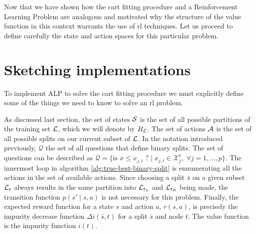 
Now that we have shown how the \ac{cart} fitting procedure and a Reinforcement
Learning Problem are analogous and motivated why the structure of the value
function in this context warrants the use of \ac{rl} techniques. Let us proceed
to define carefully the state and action spaces for this particular problem.

\section{Sketching implementations}

To implement ALP to solve the \ac{cart} fitting procedure we must explicitly
define some of the things we need to know to solve an \ac{rl} problem.

As discussed last section, the set of states $\mathcal{S}$ is the set of all
possible partitions of the training set $\mathcal{L}$, which we will denote by $B_{\mathcal{L}}$.
The set of actions $\mathcal{A}$ is the set of all possible splits on our current
subset of $\mathcal{L}$. In the notation introduced previously, $\mathcal{Q}$ the set of
all questions that define binary splits. The set of questions can be described
as $\mathcal{Q} = \{ \text{is } x \leq x_{j, i} \text{ ?} \mid x_{j, i} \in
\mathcal{X}_{j}^{t}, \; \forall j = 1, \dots, p \}$.  The innermost loop in
algorithm \ref{alg:true-best-binary-split} is ennumerating all the actions in
the set of available actions. Since choosing a split $\bar{s}$ on a given subset
$\mathcal{L}_t$ always results in the same partition into $\mathcal{L}_{t_L}$ and $\mathcal{L}_{t_R}$ being
made, the transition function $p(s' \mid s, a)$ is not necessary for this
problem. Finally, the expected reward function for a state $s$ and action $a$,
$r(s, a)$, is precisely the impurity decrease function $\Delta i(\bar{s}, t)$
for a split $\bar{s}$ and node $t$. The value function is the impurity function
$i(t)$.

